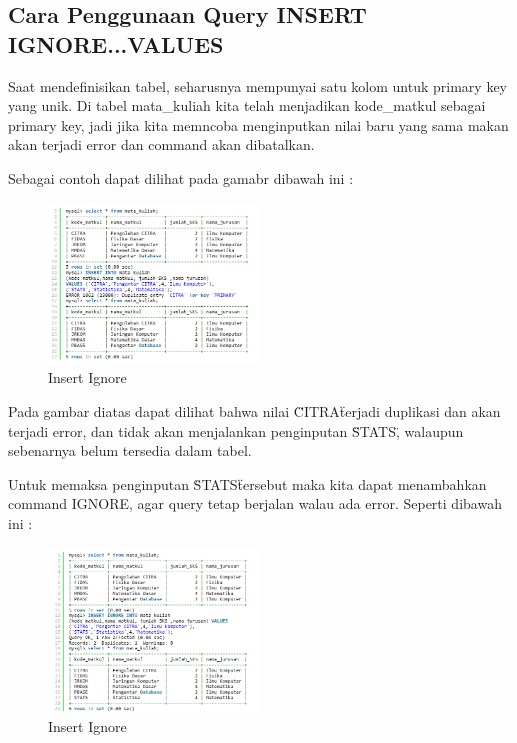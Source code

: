 	\subsection{Cara Penggunaan Query INSERT IGNORE...VALUES}
	Saat mendefinisikan tabel, seharusnya mempunyai satu kolom untuk primary key yang unik. Di tabel mata_kuliah kita telah menjadikan kode_matkul sebagai primary key, jadi jika kita memncoba menginputkan nilai baru yang sama makan akan terjadi error dan command akan dibatalkan.
	
	Sebagai contoh dapat dilihat pada gamabr dibawah ini :
	
		\begin{figure}[ht]
			\centerline{\includegraphics[width=0.5\textwidth]{figures/insert6.png}}
			\caption{Insert Ignore}
			\label{insert6}
			\end{figure}
			
	Pada gambar diatas dapat dilihat bahwa nilai \"CITRA\" terjadi duplikasi dan akan terjadi error, dan tidak akan menjalankan penginputan \"STATS\", walaupun sebenarnya belum tersedia dalam tabel.
	
	Untuk memaksa penginputan \"STATS\" tersebut  maka kita dapat menambahkan command IGNORE, agar query tetap berjalan walau ada error. Seperti dibawah ini :
	
		\begin{figure}[ht]
			\centerline{\includegraphics[width=0.5\textwidth]{figures/insert7.png}}
			\caption{Insert Ignore}
			\label{insert7}
			\end{figure}
			
